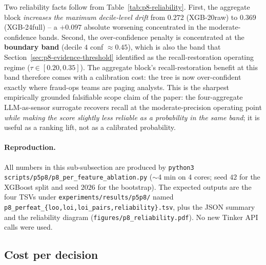 \documentclass{article}
\providecommand{\tableref}[1]{Table~\ref{#1}}
\providecommand{\secref}[1]{Section~\ref{#1}}
\begin{document}
Two reliability facts follow from \tableref{tab:p8-reliability}. First,
the aggregate block \emph{increases the maximum decile-level drift}
from $0.272$ (XGB-20raw) to $0.369$ (XGB-24full) -- a
$+0.097$ absolute worsening concentrated in the moderate-confidence
bands. Second, the over-confidence penalty is concentrated at the
\textbf{boundary band} (decile $4$ conf $\approx 0.45$), which is
also the band that
\secref{sec:p8-evidence-threshold} identified as the recall-restoration
operating regime ($\tau \in [0.20, 0.35]$). The aggregate block's
recall-restoration benefit at this band therefore comes with a
calibration cost: the tree is now over-confident exactly where
fraud-ops teams are paging analysts. This is the
sharpest empirically grounded falsifiable scope claim of the paper:
the four-aggregate LLM-as-sensor surrogate recovers recall at the
moderate-precision operating point \emph{while making the score
slightly less reliable as a probability in the same band}; it is
useful as a ranking lift, not as a calibrated probability.

\paragraph{Reproduction.} All numbers in this sub-subsection are produced
by \texttt{python3 scripts/p5p8/p8\_per\_feature\_ablation.py}
($\sim$4 min on 4 cores; seed $42$ for the XGBoost split and seed
$2026$ for the bootstrap). The expected outputs are the four TSVs
under \texttt{experiments/results/p5p8/} named
\texttt{p8\_perfeat\_\{loo,loi,loi\_pairs,reliability\}.tsv}, plus
the JSON summary and the reliability diagram
(\texttt{figures/p8\_reliability.pdf}). No new Tinker API calls were
used.

\subsection{Cost per decision}
\end{document}
